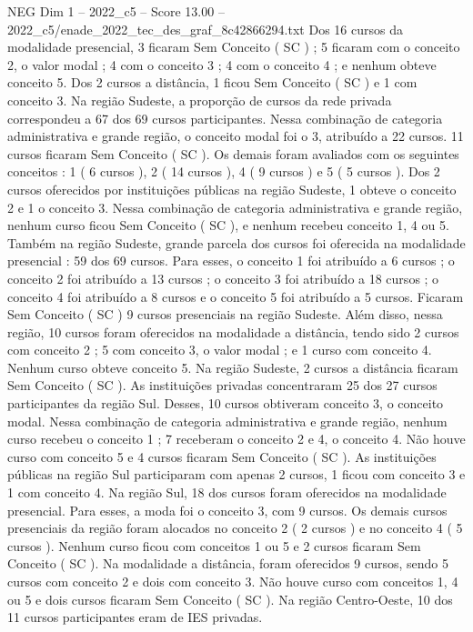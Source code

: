 \begin{textsample}{NEG Dim 1 – 2022\_c5 – Score 13.00 – 2022\_c5/enade\_2022\_tec\_des\_graf\_8c42866294.txt}
Dos 16 cursos da modalidade presencial, 3 ficaram Sem Conceito ( SC ) ; 5 ficaram com o conceito 2, o valor modal ; 4 com o conceito 3 ; 4 com o conceito 4 ; e nenhum obteve conceito 5.
Dos 2 cursos a distância, 1 ficou Sem Conceito ( SC ) e 1 com conceito 3.
Na região Sudeste, a proporção de cursos da rede privada correspondeu a 67 dos 69 cursos participantes.
Nessa combinação de categoria administrativa e grande região, o conceito modal foi o 3, atribuído a 22 cursos. 11 cursos ficaram Sem Conceito ( SC ).
Os demais foram avaliados com os seguintes conceitos : 1 ( 6 cursos ), 2 ( 14 cursos ), 4 ( 9 cursos ) e 5 ( 5 cursos ).
Dos 2 cursos oferecidos por instituições públicas na região Sudeste, 1 obteve o conceito 2 e 1 o conceito 3.
Nessa combinação de categoria administrativa e grande região, nenhum curso ficou Sem Conceito ( SC ), e nenhum recebeu conceito 1, 4 ou 5.
Também na região Sudeste, grande parcela dos cursos foi oferecida na modalidade presencial : 59 dos 69 cursos.
Para esses, o conceito 1 foi atribuído a 6 cursos ; o conceito 2 foi atribuído a 13 cursos ; o conceito 3 foi atribuído a 18 cursos ; o conceito 4 foi atribuído a 8 cursos e o conceito 5 foi atribuído a 5 cursos.
Ficaram Sem Conceito ( SC ) 9 cursos presenciais na região Sudeste.
Além disso, nessa região, 10 cursos foram oferecidos na modalidade a distância, tendo sido 2 cursos com conceito 2 ; 5 com conceito 3, o valor modal ; e 1 curso com conceito 4.
Nenhum curso obteve conceito 5.
Na região Sudeste, 2 cursos a distância ficaram Sem Conceito ( SC ).
As instituições privadas concentraram 25 dos 27 cursos participantes da região Sul.
Desses, 10 cursos obtiveram conceito 3, o conceito modal.
Nessa combinação de categoria administrativa e grande região, nenhum curso recebeu o conceito 1 ; 7 receberam o conceito 2 e 4, o conceito 4.
Não houve curso com conceito 5 e 4 cursos ficaram Sem Conceito ( SC ).
As instituições públicas na região Sul participaram com apenas 2 cursos, 1 ficou com conceito 3 e 1 com conceito 4.
Na região Sul, 18 dos cursos foram oferecidos na modalidade presencial.
Para esses, a moda foi o conceito 3, com 9 cursos.
Os demais cursos presenciais da região foram alocados no conceito 2 ( 2 cursos ) e no conceito 4 ( 5 cursos ).
Nenhum curso ficou com conceitos 1 ou 5 e 2 cursos ficaram Sem Conceito ( SC ).
Na modalidade a distância, foram oferecidos 9 cursos, sendo 5 cursos com conceito 2 e dois com conceito 3.
Não houve curso com conceitos 1, 4 ou 5 e dois cursos ficaram Sem Conceito ( SC ).
Na região Centro-Oeste, 10 dos 11 cursos participantes eram de IES privadas.

\end{textsample}
